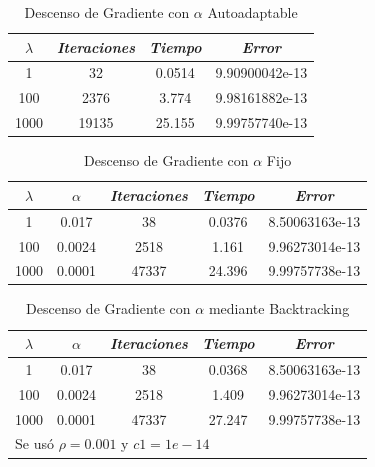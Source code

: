 \documentclass[conference]{IEEEtran}
\begin{document}
\begin{table}[htbp]
	\caption{Descenso de Gradiente con $\alpha$ Autoadaptable}
	\begin{center}
		\begin{tabular}{|c|c|c|c|}
			\hline
			\textbf{\textit{$\lambda$}}& \textbf{\textit{Iteraciones}}& \textbf{\textit{Tiempo}}& \textbf{\textit{Error}} \\
			\hline
			1& 32 & 0.0514 & 9.90900042e-13 \\
			100& 2376 & 3.774 & 9.98161882e-13 \\
			1000& 19135 & 25.155 & 9.99757740e-13 \\
			\hline
		\end{tabular}
		\label{tabg1}
	\end{center}
\end{table}
\begin{table}[htbp]
	\caption{Descenso de Gradiente con $\alpha$ Fijo}
	\begin{center}
		\begin{tabular}{|c|c|c|c|c|}
			\hline
			\textbf{\textit{$\lambda$}}& $\alpha$ &\textbf{\textit{Iteraciones}}& \textbf{\textit{Tiempo}}& \textbf{\textit{Error}} \\
			\hline
			1& 0.017 & 38 & 0.0376 & 8.50063163e-13 \\
			100& 0.0024 & 2518 & 1.161 & 9.96273014e-13 \\
			1000& 0.0001 & 47337 & 24.396 & 9.99757738e-13 \\
			\hline
		\end{tabular}
		\label{tabg2}
	\end{center}
\end{table}
\begin{table}[htbp]
	\caption{Descenso de Gradiente con $\alpha$ mediante Backtracking}
	\begin{center}
		\begin{tabular}{|c|c|c|c|c|}
			\hline
			\textbf{\textit{$\lambda$}}& $\alpha$ &\textbf{\textit{Iteraciones}}& \textbf{\textit{Tiempo}}& \textbf{\textit{Error}} \\
			\hline
			1 & 0.017 & 38 & 0.0368 & 8.50063163e-13 \\
			100 & 0.0024 & 2518 & 1.409 & 9.96273014e-13 \\
			1000 & 0.0001 & 47337 & 27.247 & 9.99757738e-13 \\
			\hline
			\multicolumn{4}{l}{Se usó $\rho=0.001$ y  $c1=1e-14$}
		\end{tabular}
		\label{tabg3}
	\end{center}
\end{table}
\end{document}
